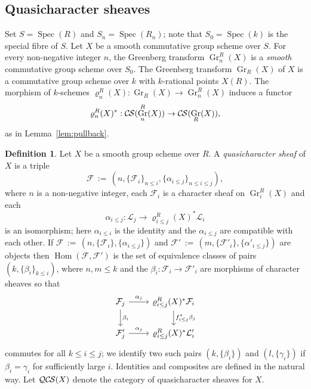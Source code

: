 \documentclass[10pt]{amsart}
\theoremstyle{plain}
\theoremstyle{definition}
\newtheorem{definition}[theorem]{Definition}
\newcommand{\Fq}{k}
\DeclareMathOperator{\Hom}{Hom}
\DeclareMathOperator{\Gr}{Gr}
\newcommand{\Spec}[1]{{\operatorname{Spec}(#1)}}
\newcommand{\ceq}{{\, :=\, }}
\newcommand{\cs}[1]{{\mathcal{#1}}}
\newcommand{\CS}{{\mathcal{C\hskip-0.8pt S}}}
\newcommand{\QCS}{{\mathcal{QC\hskip-0.8pt S}}}
\begin{document}
\subsection{Quasicharacter sheaves}
\label{ssec:CS_on_GN}
 
Set $S = \Spec{R}$ and $S_n = \Spec{R_n}$;
note that $S_0 = \Spec{\Fq}$ is the special fibre of $S$.
Let $X$ be a smooth commutative group scheme over $S$.
For every non-negative integer $n$, the Greenberg transform $\Gr^R_n(X)$ is a {\it smooth} commutative group scheme over $S_0$.
%
The Greenberg transform $\Gr_R(X)$ of $X$ is a commutative group scheme over $\Fq$
with $\Fq$-rational points $X(R)$.
%
The morphism of $\Fq$-schemes $\varrho^R_n(X) : \Gr_R(X) \to \Gr^R_n(X)$ induces a functor
\[
\varrho^R_n(X)^* : \CS(\Gr^R_n(X)) \to \CS(\Gr_R(X)),
\]
as in Lemma~\ref{lem:pullback}.

\begin{definition}\label{def:QCS}
Let $X$ be a smooth group scheme over $R$.
A {\it quasicharacter sheaf} of $X$ is a triple 
\[
\cs{F} \ceq (n, \{\cs{F}_i\}_{n\leq i}, \{\alpha_{i \le j}\}_{n\le i \le j}),
\] 
where $n$
is a non-negative integer, each $\cs{F}_i$ is a character sheaf on $\Gr^R_i(X)$ and each 
\[
\alpha_{i \le j} : \cs{L}_j \to \varrho^R_{i \le j}(X)^* \cs{L}_i
\]
 is an isomorphism; here $\alpha_{i \le i}$ is the identity and the $\alpha_{i \le j}$ are compatible with each other.  
If $\cs{F} \ceq (n, \{\cs{F}_i\}, \{\alpha_{i \le j}\})$
and $\cs{F}' \ceq (m, \{\cs{F}'_i\}, \{\alpha'_{i \le j}\})$ are objects then $\Hom(\cs{F}, \cs{F}')$ is the set
of equivalence classes of pairs $(k, \{\beta_i\}_{k \le i})$, where $n,m \le k$ and the $\beta_i : \cs{F}_i \to \cs{F}'_i$ are
morphisms of character sheaves so that
\[
\begin{tikzcd}
\cs{F}_j \rar{\alpha_j} \dar{\beta_i} & \varrho^R_{i \le j}(X)^* \cs{F}_i \dar{f_{i \le j}^*\beta_j} \\
\cs{F}'_j \rar{\alpha_j} & \varrho^R_{i \le j}(X)^* \cs{L}'_i
\end{tikzcd}
\]
commutes for all $k\le i\le j$; we identify two such pairs $(k, \{\beta_i\})$ and $(l, \{\gamma_i\})$ if $\beta_i = \gamma_i$
for sufficiently large $i$.  Identities and composites are defined in the natural way.
Let $\QCS(X)$ denote the category of quasicharacter sheaves for $X$.
\end{definition}
\end{document}
